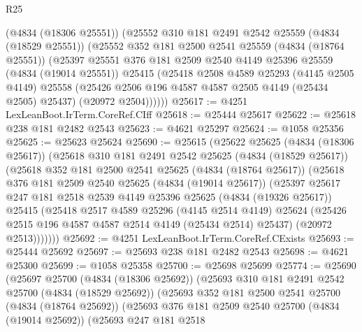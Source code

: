 \begin{lexlean}{R25}
\begin{coremodule}
      (@4834 (@18306 @25551))
      (@25552
        @310
        @181
        @2491
        @2542
        @25559
        (@4834 (@18529 @25551))
        (@25552
          @352
          @181
          @2500
          @2541
          @25559
          (@4834 (@18764 @25551))
          (@25397
            @25551
            @376
            @181
            @2509
            @2540
            @4149
            @25396
            @25559
            (@4834 (@19014 @25551))
            @25415
            (@25418
              @2508
              @4589
              @25293
              (@4145 @2505 @4149)
              @25558
              (@25426 @2506 @196 @4587 @4587 @2505 @4149 (@25434 @2505) @25437)
              (@20972 @2504))))))
@25617 := @4251 LexLeanBoot.IrTerm.CoreRef.CIff
@25618 := @25444 @25617
@25622 := @25618 @238 @181 @2482 @2543
@25623 := @4621 @25297
@25624 := @1058 @25356
@25625 := @25623 @25624
@25690 := @25615
    (@25622
      @25625
      (@4834 (@18306 @25617))
      (@25618
        @310
        @181
        @2491
        @2542
        @25625
        (@4834 (@18529 @25617))
        (@25618
          @352
          @181
          @2500
          @2541
          @25625
          (@4834 (@18764 @25617))
          (@25618
            @376
            @181
            @2509
            @2540
            @25625
            (@4834 (@19014 @25617))
            (@25397
              @25617
              @247
              @181
              @2518
              @2539
              @4149
              @25396
              @25625
              (@4834 (@19326 @25617))
              @25415
              (@25418
                @2517
                @4589
                @25296
                (@4145 @2514 @4149)
                @25624
                (@25426 @2515 @196 @4587 @4587 @2514 @4149 (@25434 @2514) @25437)
                (@20972 @2513)))))))
@25692 := @4251 LexLeanBoot.IrTerm.CoreRef.CExists
@25693 := @25444 @25692
@25697 := @25693 @238 @181 @2482 @2543
@25698 := @4621 @25300
@25699 := @1058 @25358
@25700 := @25698 @25699
@25774 := @25690
    (@25697
      @25700
      (@4834 (@18306 @25692))
      (@25693
        @310
        @181
        @2491
        @2542
        @25700
        (@4834 (@18529 @25692))
        (@25693
          @352
          @181
          @2500
          @2541
          @25700
          (@4834 (@18764 @25692))
          (@25693
            @376
            @181
            @2509
            @2540
            @25700
            (@4834 (@19014 @25692))
            (@25693
              @247
              @181
              @2518

\end{coremodule}
\end{lexlean}
